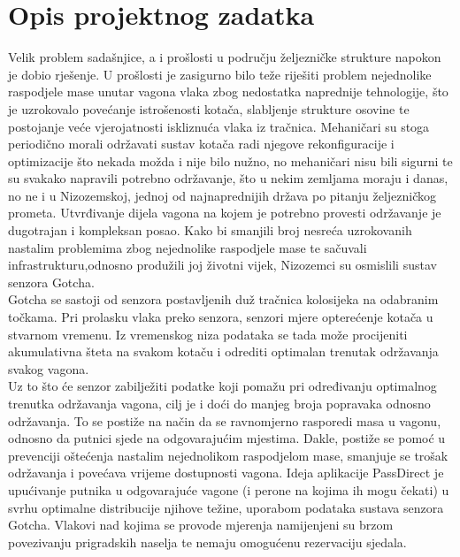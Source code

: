 \chapter{Opis projektnog zadatka}
\vspace{1cm}

Velik problem sadašnjice, a i prošlosti u području željezničke strukture napokon je dobio rješenje. U prošlosti je zasigurno bilo teže riješiti problem nejednolike raspodjele mase unutar vagona vlaka zbog nedostatka naprednije tehnologije, što je uzrokovalo povećanje istrošenosti kotača, slabljenje strukture osovine te postojanje veće vjerojatnosti iskliznuća vlaka iz tračnica.
Mehaničari su  stoga periodično morali održavati sustav kotača radi njegove
rekonfiguracije i optimizacije što nekada možda i nije bilo nužno, no mehaničari nisu bili sigurni te su svakako napravili potrebno održavanje, što u nekim zemljama moraju i danas, no ne i u Nizozemskoj, jednoj od najnaprednijih država po pitanju željezničkog prometa. Utvrđivanje dijela vagona na kojem je potrebno provesti održavanje je dugotrajan i kompleksan posao.  Kako bi smanjili broj nesreća uzrokovanih nastalim problemima zbog nejednolike raspodjele mase te sačuvali infrastrukturu,odnosno produžili joj životni vijek, Nizozemci su osmislili sustav senzora Gotcha.\\
Gotcha se sastoji od senzora postavljenih duž tračnica kolosijeka na odabranim točkama.
Pri prolasku vlaka preko senzora, senzori mjere opterećenje kotača u
stvarnom vremenu. Iz vremenskog niza podataka se tada može procijeniti akumulativna
šteta na svakom kotaču i odrediti optimalan trenutak održavanja svakog vagona.\\
Uz to što će senzor zabilježiti podatke koji pomažu pri određivanju optimalnog trenutka održavanja vagona, cilj je i doći do manjeg broja popravaka odnosno održavanja. To se postiže na način da se ravnomjerno rasporedi masa u vagonu, odnosno da putnici sjede na odgovarajućim mjestima. Dakle, postiže se pomoć u prevenciji
oštećenja nastalim nejednolikom raspodjelom mase, smanjuje se trošak održavanja i
povećava vrijeme dostupnosti vagona. Ideja aplikacije PassDirect je upućivanje putnika u odgovarajuće vagone (i perone na kojima ih mogu čekati) u svrhu optimalne distribucije njihove težine, uporabom podataka sustava senzora Gotcha. Vlakovi nad kojima se provode mjerenja namijenjeni su brzom povezivanju prigradskih naselja te nemaju omogućenu rezervaciju sjedala.\\

